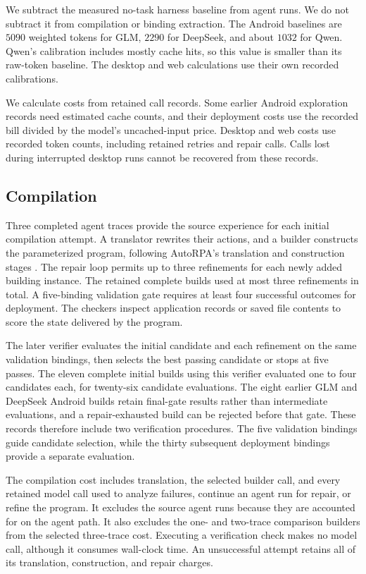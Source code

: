 We subtract the measured no-task harness baseline from agent runs.
We do not subtract it from compilation or binding extraction.
The Android baselines are $5090$ weighted tokens for GLM, $2290$ for DeepSeek, and about $1032$ for Qwen.
Qwen's calibration includes mostly cache hits, so this value is smaller than its raw-token baseline.
The desktop and web calculations use their own recorded calibrations.

We calculate costs from retained call records.
Some earlier Android exploration records need estimated cache counts, and their deployment costs use the recorded bill divided by the model's uncached-input price.
Desktop and web costs use recorded token counts, including retained retries and repair calls.
Calls lost during interrupted desktop runs cannot be recovered from these records.

\subsection{Compilation}
\label{sec:protocol}

Three completed agent traces provide the source experience for each initial compilation attempt.
A translator rewrites their actions, and a builder constructs the parameterized program, following AutoRPA's translation and construction stages \citep{chen2026autorpa}.
The repair loop permits up to three refinements for each newly added building instance.
The retained complete builds used at most three refinements in total.
A five-binding validation gate requires at least four successful outcomes for deployment.
The checkers inspect application records or saved file contents to score the state delivered by the program.

The later verifier evaluates the initial candidate and each refinement on the same validation bindings, then selects the best passing candidate or stops at five passes.
The eleven complete initial builds using this verifier evaluated one to four candidates each, for twenty-six candidate evaluations.
The eight earlier GLM and DeepSeek Android builds retain final-gate results rather than intermediate evaluations, and a repair-exhausted build can be rejected before that gate.
These records therefore include two verification procedures.
The five validation bindings guide candidate selection, while the thirty subsequent deployment bindings provide a separate evaluation.

The compilation cost includes translation, the selected builder call, and every retained model call used to analyze failures, continue an agent run for repair, or refine the program.
It excludes the source agent runs because they are accounted for on the agent path.
It also excludes the one- and two-trace comparison builders from the selected three-trace cost.
Executing a verification check makes no model call, although it consumes wall-clock time.
An unsuccessful attempt retains all of its translation, construction, and repair charges.

